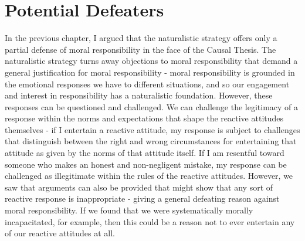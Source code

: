 \documentclass[phd,12pt,oneside,paper=letterpaper]{ubcthesis}
\begin{document}
\chapter{Potential Defeaters}

In the previous chapter, I argued that the naturalistic strategy offers only a partial defense of moral responsibility in the face of the Causal Thesis. The naturalistic strategy turns away objections to moral responsibility that demand a general justification for moral responsibility - moral responsibility is grounded in the emotional responses we have to different situations, and so our engagement and interest in responsibility has a naturalistic foundation. However, these responses can be questioned and challenged. We can challenge the legitimacy of a response within the norms and expectations that shape the reactive attitudes themselves - if I entertain a reactive attitude, my response is subject to challenges that distinguish between the right and wrong circumstances for entertaining that attitude as given by the norms of that attitude itself. If I am resentful toward someone who makes an honest and non-negligent mistake, my response can be challenged as illegitimate within the rules of the reactive attitudes. However, we saw that arguments can also be provided that might show that any sort of reactive response is inappropriate - giving a general defeating reason against moral responsibility. If we found that we were systematically morally incapacitated, for example, then this could be a reason not to ever entertain any of our reactive attitudes at all.
\end{document}
